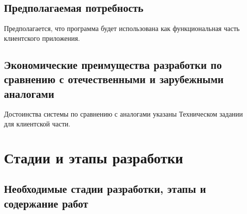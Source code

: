 \documentclass[techtask]{espd}
\begin{document}
\subsection{Предполагаемая потребность}
Предполагается, что программа будет использована как функциональная часть клиентского приложения.

\subsection{Экономические преимущества разработки по сравнению с отечественными и зарубежными аналогами}
Достоинства системы по сравнению с аналогами указаны Техническом задании для клиентской части.

\section{Стадии и этапы разработки}
\subsection{Необходимые стадии разработки, этапы и содержание работ}
\end{document}

